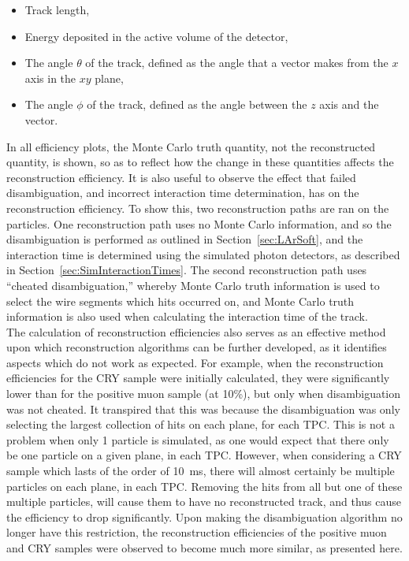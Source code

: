 \begin{itemize}
\item Track length,
\item Energy deposited in the active volume of the detector,
\item The angle $\theta$ of the track, defined as the angle that a vector makes from the $x$ axis in the $xy$ plane,
\item The angle $\phi$ of the track, defined as the angle between the $z$ axis and the vector.
\end{itemize}
In all efficiency plots, the Monte Carlo truth quantity, not the reconstructed quantity, is shown, so as to reflect how the change in these quantities affects the reconstruction efficiency. It is also useful to observe the effect that failed disambiguation, and incorrect interaction time determination, has on the reconstruction efficiency. To show this, two reconstruction paths are ran on the particles. One reconstruction path uses no Monte Carlo information, and so the disambiguation is performed as outlined in Section~\ref{sec:LArSoft}, and the interaction time is determined using the simulated photon detectors, as described in Section~\ref{sec:SimInteractionTimes}. The second reconstruction path uses ``cheated disambiguation,'' whereby Monte Carlo truth information is used to select the wire segments which hits occurred on, and Monte Carlo truth information is also used when calculating the interaction time of the track. \\

The calculation of reconstruction efficiencies also serves as an effective method upon which reconstruction algorithms can be further developed, as it identifies aspects which do not work as expected. For example, when the reconstruction efficiencies for the CRY sample were initially calculated, they were significantly lower than for the positive muon sample (at 10\%), but only when disambiguation was not cheated. It transpired that this was because the disambiguation was only selecting the largest collection of hits on each plane, for each TPC. This is not a problem when only 1 particle is simulated, as one would expect that there only be one particle on a given plane, in each TPC. However, when considering a CRY sample which lasts of the order of 10~ms, there will almost certainly be multiple particles on each plane, in each TPC. Removing the hits from all but one of these multiple particles, will cause them to have no reconstructed track, and thus cause the efficiency to drop significantly. Upon making the disambiguation algorithm no longer have this restriction, the reconstruction efficiencies of the positive muon and CRY samples were observed to become much more similar, as presented here. \\

